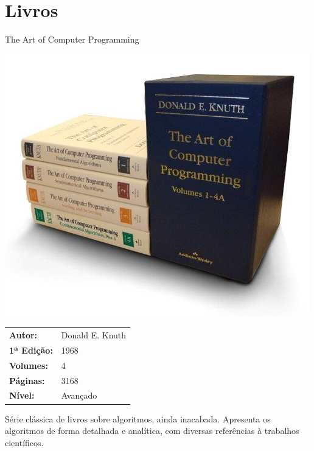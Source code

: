 \section{Livros}

\begin{frame}[fragile]{The Art of Computer Programming}

    \begin{minipage}{0.45\textwidth}
        \includegraphics[scale=0.25]{knuth.jpg}
    \end{minipage}
    \begin{minipage}{0.45\textwidth}
        \begin{small}
            \begin{tabularx}{0.95\textwidth}{lX}
                \textbf{Autor:} & Donald E. Knuth \\
                \textbf{1ª Edição:} & 1968 \\
                \textbf{Volumes:} & 4 \\
                \textbf{Páginas:} & 3168 \\
                \textbf{Nível:} & Avançado \\
            \end{tabularx}
        \end{small}
    \end{minipage}

    Série clássica de livros sobre algoritmos, ainda inacabada. Apresenta os algoritmos de
    forma detalhada e analítica, com diversas referências à trabalhos científicos.

\end{frame}


